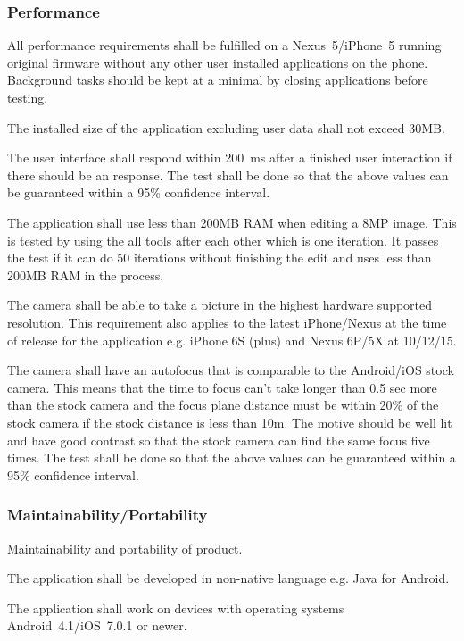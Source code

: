 \documentclass[10pt,a4paper]{article}
\begin{document}
\subsubsection{Performance}
All performance requirements shall be fulfilled on a Nexus~5/iPhone~5 running original firmware without any other user installed applications on the phone. Background tasks should be kept at a minimal by closing applications before testing.

\begin{description}
	\item [Req \thesubsubsection {.\theperf} Application size] The installed size of the application excluding user data shall not exceed 30MB.	
	\item [Req \thesubsubsection {.\theperf} Speed] The user interface shall respond within 200~ms after a finished user interaction if there should be an response. The test shall be done so that the above values can be guaranteed within a 95\% confidence interval.
	\item [Req \thesubsubsection {.\theperf} Memory] The application shall use less than 200MB RAM when editing a 8MP image. This is tested by using the all tools after each other which is one iteration. It passes the test if it can do 50 iterations without finishing the edit and uses less than 200MB RAM in the process.
	\item [Req \thesubsubsection {.\theperf} Picture quality] The camera shall be able to take a picture in the highest hardware supported resolution. This requirement also applies to the latest iPhone/Nexus at the time of release for the application e.g. iPhone 6S (plus) and Nexus 6P/5X at 10/12/15.
	\item [Req \thesubsubsection {.\theperf} Autofocus] The camera shall have an autofocus that is comparable to the Android/iOS stock camera. This means that the time to focus can't take longer than 0.5 sec more than the stock camera and the focus plane distance must be within 20\% of the stock camera if the stock distance is less than 10m. The motive should be well lit and have good contrast so that the stock camera can find the same focus five times. The test shall be done so that the above values can be guaranteed within a 95\% confidence interval.
\end{description}

\subsubsection{Maintainability/Portability}
Maintainability and portability of product.
\begin{description}
	\item [Req \thesubsubsection {.\themapo} Language] The application shall be developed in non-native language e.g. Java for Android. 
	\item [Req \thesubsubsection {.\themapo} Device support] The application shall work on devices with operating systems Android~4.1/iOS~7.0.1 or newer.
\end{description}
\end{document}
